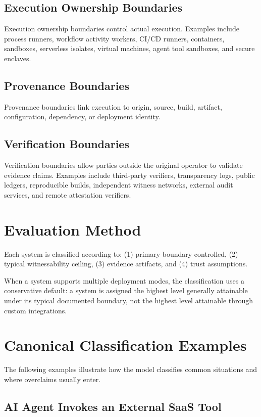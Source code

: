 \documentclass[11pt]{article}
\begin{document}
\subsection{Execution Ownership Boundaries}
Execution ownership boundaries control actual execution. Examples include process runners, workflow activity workers, CI/CD runners, containers, sandboxes, serverless isolates, virtual machines, agent tool sandboxes, and secure enclaves.

\subsection{Provenance Boundaries}
Provenance boundaries link execution to origin, source, build, artifact, configuration, dependency, or deployment identity.

\subsection{Verification Boundaries}
Verification boundaries allow parties outside the original operator to validate evidence claims. Examples include third-party verifiers, transparency logs, public ledgers, reproducible builds, independent witness networks, external audit services, and remote attestation verifiers.

\section{Evaluation Method}
\label{sec:evaluation-method}

Each system is classified according to: (1) primary boundary controlled, (2) typical witnessability ceiling, (3) evidence artifacts, and (4) trust assumptions.

When a system supports multiple deployment modes, the classification uses a conservative default: a system is assigned the highest level generally attainable under its typical documented boundary, not the highest level attainable through custom integrations.

\section{Canonical Classification Examples}

The following examples illustrate how the model classifies common situations and where overclaims usually enter.

\subsection{AI Agent Invokes an External SaaS Tool}
\end{document}
